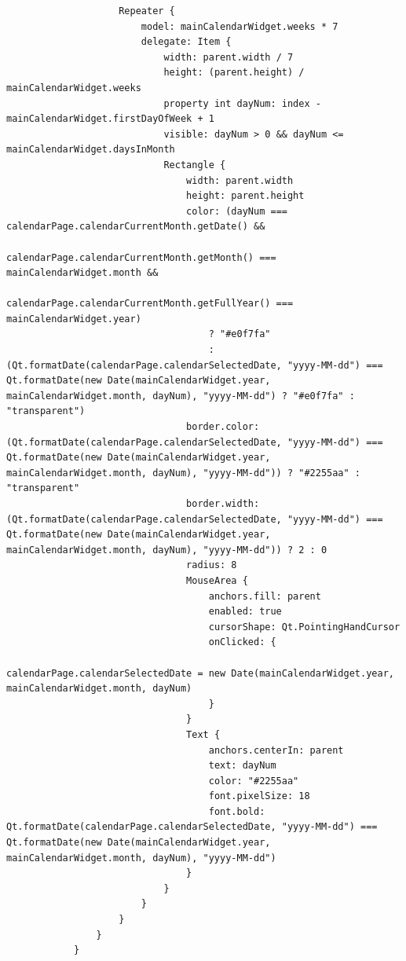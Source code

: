 \documentclass{report}
\begin{document}
\begin{lstlisting}
                    Repeater {
                        model: mainCalendarWidget.weeks * 7
                        delegate: Item {
                            width: parent.width / 7
                            height: (parent.height) / mainCalendarWidget.weeks
                            property int dayNum: index - mainCalendarWidget.firstDayOfWeek + 1
                            visible: dayNum > 0 && dayNum <= mainCalendarWidget.daysInMonth
                            Rectangle {
                                width: parent.width
                                height: parent.height
                                color: (dayNum === calendarPage.calendarCurrentMonth.getDate() &&
                                        calendarPage.calendarCurrentMonth.getMonth() === mainCalendarWidget.month &&
                                        calendarPage.calendarCurrentMonth.getFullYear() === mainCalendarWidget.year)
                                    ? "#e0f7fa"
                                    : (Qt.formatDate(calendarPage.calendarSelectedDate, "yyyy-MM-dd") === Qt.formatDate(new Date(mainCalendarWidget.year, mainCalendarWidget.month, dayNum), "yyyy-MM-dd") ? "#e0f7fa" : "transparent")
                                border.color: (Qt.formatDate(calendarPage.calendarSelectedDate, "yyyy-MM-dd") === Qt.formatDate(new Date(mainCalendarWidget.year, mainCalendarWidget.month, dayNum), "yyyy-MM-dd")) ? "#2255aa" : "transparent"
                                border.width: (Qt.formatDate(calendarPage.calendarSelectedDate, "yyyy-MM-dd") === Qt.formatDate(new Date(mainCalendarWidget.year, mainCalendarWidget.month, dayNum), "yyyy-MM-dd")) ? 2 : 0
                                radius: 8
                                MouseArea {
                                    anchors.fill: parent
                                    enabled: true
                                    cursorShape: Qt.PointingHandCursor
                                    onClicked: {
                                        calendarPage.calendarSelectedDate = new Date(mainCalendarWidget.year, mainCalendarWidget.month, dayNum)
                                    }
                                }
                                Text {
                                    anchors.centerIn: parent
                                    text: dayNum
                                    color: "#2255aa"
                                    font.pixelSize: 18
                                    font.bold: Qt.formatDate(calendarPage.calendarSelectedDate, "yyyy-MM-dd") === Qt.formatDate(new Date(mainCalendarWidget.year, mainCalendarWidget.month, dayNum), "yyyy-MM-dd")
                                }
                            }
                        }
                    }
                }
            }


\end{lstlisting}
\end{document}
